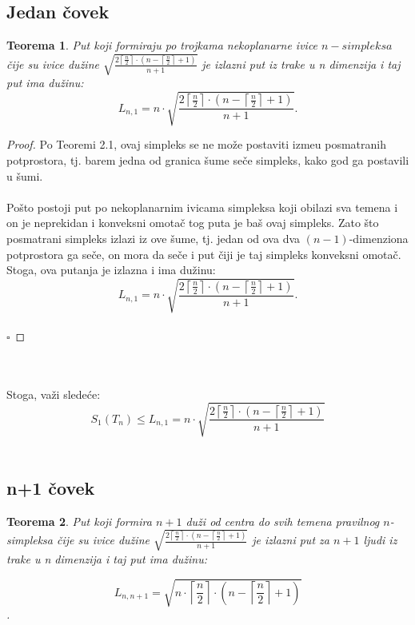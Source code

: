 \documentclass[11pt,letter]{article}
\newtheorem{teo}{\bf Teorema}[section]
\begin{document}
\subsection[Jedan \v covek]{Jedan \v covek}
\bigskip
\begin{teo} Put koji formiraju po trojkama nekoplanarne ivice $n-simpleksa$ \v cije su ivice du\v zine $\sqrt{\frac{2\left\lceil \frac{n}{2}\right\rceil\cdot \left( n-\left\lceil\frac{n}{2}\right\rceil+1\right)}{n+1}}$ je izlazni put iz trake u n dimenzija i taj put ima du\v zinu:
$$L_{n,1}=n\cdot \sqrt{\frac{2\left\lceil \frac{n}{2}\right\rceil\cdot \left( n-\left\lceil\frac{n}{2}\right\rceil+1\right)}{n+1}}.$$\end{teo}
\smallskip

\begin{proof}
Po Teoremi 2.1, ovaj simpleks se ne mo\v ze postaviti izme\dj u posmatranih potprostora, tj. barem jedna od granica \v sume se\v ce simpleks, kako god ga postavili u \v sumi.
\\
\\
\indent Po\v sto postoji put po nekoplanarnim ivicama simpleksa koji obilazi sva temena i on je neprekidan i konveksni omota\v c tog puta je ba\v s ovaj simpleks. Zato \v sto posmatrani simpleks izlazi iz ove \v sume, tj. jedan od ova dva $(n-1)$-dimenziona potprostora ga se\v ce, on mora da se\v ce i put \v ciji je taj simpleks konveksni omota\v c. Stoga, ova putanja je izlazna i ima du\v zinu:
\\
$$L_{n,1}=n\cdot \sqrt{\frac{2\left\lceil \frac{n}{2}\right\rceil\cdot \left( n-\left\lceil\frac{n}{2}\right\rceil+1\right)}{n+1}}.$$
\\
$\square$
\end{proof}
\\
\\
\indent Stoga, va\v zi slede\' ce:
$$S_1(T_n)\leqslant L_{n, 1}=n\cdot \sqrt{\frac{2\left\lceil \frac{n}{2}\right\rceil\cdot \left( n-\left\lceil\frac{n}{2}\right\rceil+1\right)}{n+1}}$$
\\
\subsection[n+1 \v covek]{n+1 \v covek} 
\bigskip
\begin{teo} Put koji formira $n+1$ du\v zi od centra do svih temena pravilnog $n$-simpleksa  \v cije su ivice du\v zine $\sqrt{\frac{2\left\lceil \frac{n}{2}\right\rceil\cdot \left( n-\left\lceil\frac{n}{2}\right\rceil+1\right)}{n+1}}$ je izlazni put za $n+1$ ljudi iz trake u n dimenzija i taj put ima du\v zinu:

$$L_{n,n+1}=\sqrt{n\cdot\left\lceil\frac{n}{2}\right\rceil\cdot\left( n-\left\lceil\frac{n}{2}\right\rceil+1\right)}$$.\end{teo}
\end{document}
